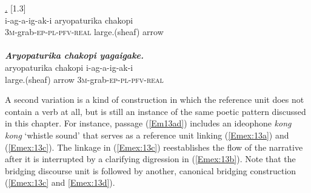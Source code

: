 \documentclass[output=paper]{LSP/langsci}
\begin{document}
\begin{exe}
\ex \label{Em12ab}
\begin{xlist}
\ex \label{Emex:12a}
\glt \textit{ \underline{.}} [1.3]\\
\gll i-ag-a-ig-ak-i aryopaturika chakopi\\
 \textsc{3m-}grab\textsc{-ep-pl-pfv-real} large.(sheaf) arrow\\
\glt {}\\
\ex \label{Emex:12b}
\glt \textit{\textbf{Aryopaturika chakopi yagaigake.}}\\
\gll aryopaturika chakopi i-ag-a-ig-ak-i \\     	      
   large.(sheaf) arrow \textsc{3m-}grab\textsc{-ep-pl-pfv-real}\\
\glt {}
\end{xlist}
\end{exe}

A second variation is a kind of construction in which the reference unit does not contain a verb at all, but is still an instance of the same poetic pattern discussed in this chapter. For instance, passage (\ref{Em13ad}) includes an ideophone \textit{kong kong} `whistle sound' that serves as a reference unit linking (\ref{Emex:13a}) and (\ref{Emex:13c}). The linkage in (\ref{Emex:13c}) reestablishes the flow of the narrative after it is interrupted by a clarifying digression in (\ref{Emex:13b}). Note that the bridging discourse unit is followed by another, canonical bridging construction (\ref{Emex:13c} and \ref{Emex:13d}).
\end{document}
